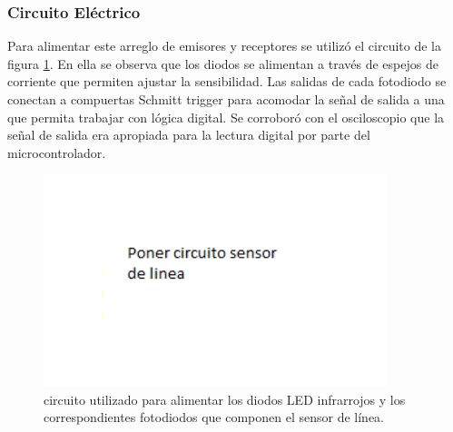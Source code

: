 \documentclass[10pt,conference,a4paper,onecolumn]{article}%
\begin{document}
\subsubsection{Circuito Eléctrico}
Para alimentar este arreglo de emisores y receptores se utilizó el circuito de la figura \ref{fig:circuitoSensorLinea}. En ella se observa que los diodos se alimentan a través de espejos de corriente que permiten ajustar la sensibilidad. Las salidas de cada fotodiodo se conectan a compuertas Schmitt trigger para acomodar la señal de salida a una que permita trabajar con lógica digital. Se corroboró con el osciloscopio que la señal de salida era apropiada para la lectura digital por parte del microcontrolador.
\begin{figure}[h]
	\centering
	\includegraphics[width=10cm]{./imagenes/circuitoSensorLinea}
	\caption{circuito utilizado para alimentar los diodos LED infrarrojos y los correspondientes fotodiodos que componen el sensor de línea.}
	\label{fig:circuitoSensorLinea}
\end{figure}
\end{document}

